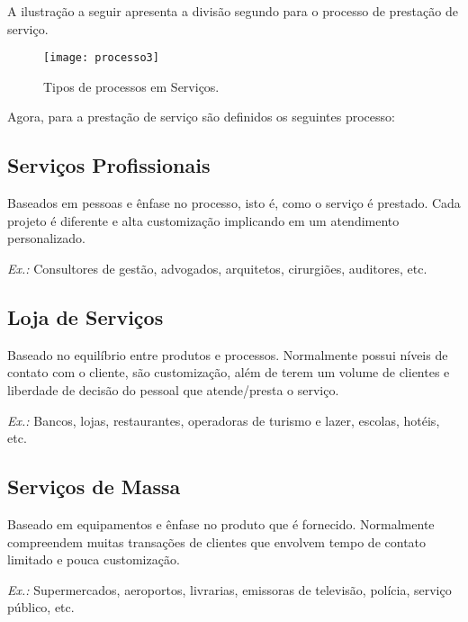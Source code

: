 			A ilustração a seguir apresenta a divisão segundo \cite{slack} para o processo de prestação de serviço.

			\newpage
			\begin{figure}[h]
				\centering
				\texttt{[image: processo3]}
				\caption[Tipos de processos em Serviços]{Tipos de processos em Serviços.}
				\label{fig:processo3}
			\end{figure}

			Agora, para a prestação de serviço são definidos os seguintes processo:

			\subsection[Serviços Profissionais]{Serviços Profissionais}
			\label{sec:processos_servico_profissionais}

				Baseados em pessoas e ênfase no processo, isto é, como o serviço é prestado. Cada projeto é diferente e alta customização implicando em um atendimento personalizado.
				
				\emph{Ex.:} Consultores de gestão, advogados, arquitetos, cirurgiões, auditores, etc.

			\subsection[Loja de Serviços]{Loja de Serviços}
			\label{sec:processos_servico_loja}

				Baseado no equilíbrio entre produtos e processos. Normalmente possui níveis de contato com o cliente, são customização, além de terem um volume de clientes e liberdade de decisão do pessoal que atende/presta o serviço.
			
				\emph{Ex.:} Bancos, lojas, restaurantes, operadoras de turismo e lazer, escolas, hotéis, etc.

			\subsection[Serviços de Massa]{Serviços de Massa}
			\label{sec:processos_servico_massa}

				Baseado em equipamentos e ênfase no produto que é fornecido. Normalmente compreendem muitas transações de clientes que envolvem tempo de contato limitado e pouca customização.
				
				\emph{Ex.:} Supermercados, aeroportos, livrarias, emissoras de televisão, polícia, serviço público, etc. 

